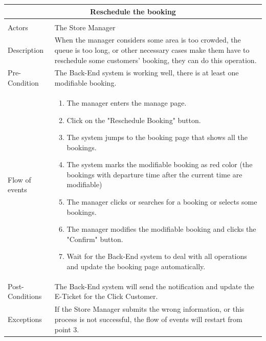 \documentclass[a4paper,12pt]{report}
\begin{document}
\begin{center}
	\begin{tabular}{p{}|p{}}
		\multicolumn{2}{c}{\large \textbf{Reschedule the booking}} \\[3mm] 
		\hline \\
		Actors &   The Store Manager \\[3mm] 
		Description & When the manager considers some area is too crowded, the queue is too long, or other necessary cases make them have to reschedule some customers' booking, they can do this operation. \\[3mm]  
		Pre-Condition & The Back-End system is working well, there is at least one modifiable booking.  \\[3mm] 
		Flow of events & 
		\begin{enumerate}
			\item The manager enters the manage page.
			\item Click on the "Reschedule Booking" button.
			\item The system jumps to the booking page that shows all the bookings.
			\item The system marks the modifiable booking as red color (the bookings with departure time after the current time are modifiable)
			\item The manager clicks or searches for a booking or selects some bookings.
			\item The manager modifies the modifiable booking and clicks the "Confirm" button.
			\item Wait for the Back-End system to deal with all operations and update the booking page automatically.
		\end{enumerate}
		\\[3mm] 
		Post-Conditions & The Back-End system will send the notification and update the E-Ticket for the Click Customer. \\[3mm] 
		Exceptions & If the Store Manager submits the wrong information, or this process is not successful, the flow of events will restart from point 3. \\[3mm] 
	\end{tabular}
\end{center}
\end{document}
